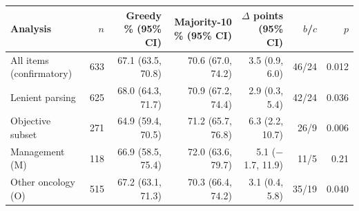 \begin{tabular}{@{}lrrrrrr@{}}
\toprule
Analysis & $n$ & Greedy \% (95\% CI) & Majority-10 \% (95\% CI) & $\Delta$ points (95\% CI) & $b$/$c$ & $p$ \\
\midrule
All items (confirmatory) & 633 & 67.1 (63.5, 70.8) & 70.6 (67.0, 74.2) & 3.5 (0.9, 6.0) & 46/24 & 0.012 \\
\midrule
Lenient parsing & 625 & 68.0 (64.3, 71.7) & 70.9 (67.2, 74.4) & 2.9 (0.3, 5.4) & 42/24 & 0.036 \\
Objective subset & 271 & 64.9 (59.4, 70.5) & 71.2 (65.7, 76.8) & 6.3 (2.2, 10.7) & 26/9 & 0.006 \\
Management (M) & 118 & 66.9 (58.5, 75.4) & 72.0 (63.6, 79.7) & 5.1 ($-$1.7, 11.9) & 11/5 & 0.21 \\
Other oncology (O) & 515 & 67.2 (63.1, 71.3) & 70.3 (66.4, 74.2) & 3.1 (0.4, 5.8) & 35/19 & 0.040 \\
\bottomrule
\end{tabular}
